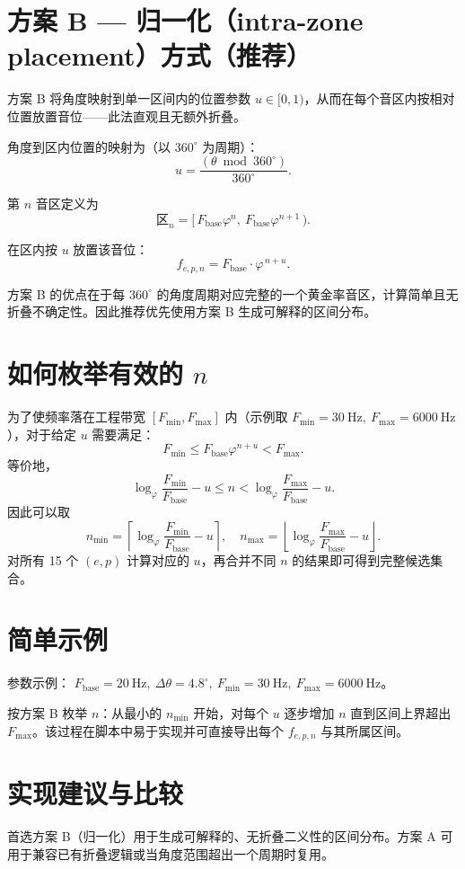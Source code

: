\documentclass{article}
\begin{document}
\section*{方案 B — 归一化（intra-zone placement）方式（推荐）}
方案 B 将角度映射到单一区间内的位置参数 \(u\in[0,1)\)，从而在每个音区内按相对位置放置音位——此法直观且无额外折叠。

角度到区内位置的映射为（以 $360^\circ$ 为周期）：
\[
u=\frac{(\theta \bmod 360^\circ)}{360^\circ}.
\]

第 \(n\) 音区定义为
\[
\text{区}_n=[\,F_{\mathrm{base}}\varphi^{n},\ F_{\mathrm{base}}\varphi^{n+1}\,).
\]

在区内按 \(u\) 放置该音位：
\[
f_{e,p,n} = F_{\mathrm{base}}\cdot \varphi^{\,n+u}.
\]

方案 B 的优点在于每 $360^\circ$ 的角度周期对应完整的一个黄金率音区，计算简单且无折叠不确定性。因此推荐优先使用方案 B 生成可解释的区间分布。

\section*{如何枚举有效的 \(n\)}
为了使频率落在工程带宽 \([F_{\min},F_{\max}]\) 内（示例取 \(F_{\min}=30\ \mathrm{Hz},\ F_{\max}=6000\ \mathrm{Hz}\)），对于给定 \(u\) 需要满足：
\[
F_{\min}\le F_{\mathrm{base}}\varphi^{n+u}<F_{\max}.
\]
等价地，
\[
\log_{\varphi}\frac{F_{\min}}{F_{\mathrm{base}}}-u \le n < \log_{\varphi}\frac{F_{\max}}{F_{\mathrm{base}}}-u.
\]
因此可以取
\[
n_{\min}=\left\lceil \log_{\varphi}\frac{F_{\min}}{F_{\mathrm{base}}}-u \right\rceil,\quad
n_{\max}=\left\lfloor \log_{\varphi}\frac{F_{\max}}{F_{\mathrm{base}}}-u \right\rfloor.
\]
对所有 15 个 \((e,p)\) 计算对应的 \(u\)，再合并不同 \(n\) 的结果即可得到完整候选集合。

\section*{简单示例}
参数示例： \(F_{\mathrm{base}}=20\ \mathrm{Hz},\ \Delta\theta=4.8^\circ,\ F_{\min}=30\ \mathrm{Hz},\ F_{\max}=6000\ \mathrm{Hz}\)。

按方案 B 枚举 \(n\)：从最小的 \(n_{\min}\) 开始，对每个 \(u\) 逐步增加 \(n\) 直到区间上界超出 \(F_{\max}\)。该过程在脚本中易于实现并可直接导出每个 \(f_{e,p,n}\) 与其所属区间。

\section*{实现建议与比较}
首选方案 B（归一化）用于生成可解释的、无折叠二义性的区间分布。方案 A 可用于兼容已有折叠逻辑或当角度范围超出一个周期时复用。
\end{document}
